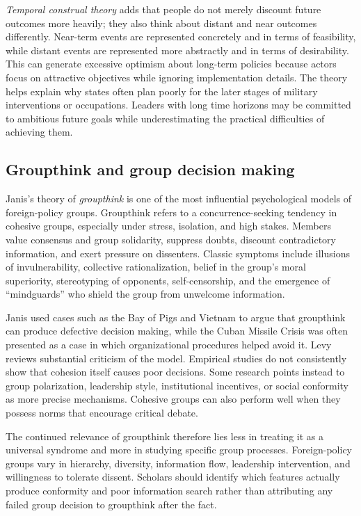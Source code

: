 \emph{Temporal construal theory} adds that people do not merely discount future outcomes more heavily; they also think about distant and near outcomes differently. Near-term events are represented concretely and in terms of feasibility, while distant events are represented more abstractly and in terms of desirability. This can generate excessive optimism about long-term policies because actors focus on attractive objectives while ignoring implementation details. The theory helps explain why states often plan poorly for the later stages of military interventions or occupations. Leaders with long time horizons may be committed to ambitious future goals while underestimating the practical difficulties of achieving them.

\subsection{Groupthink and group decision making}

Janis's theory of \emph{groupthink} is one of the most influential psychological models of foreign-policy groups. Groupthink refers to a concurrence-seeking tendency in cohesive groups, especially under stress, isolation, and high stakes. Members value consensus and group solidarity, suppress doubts, discount contradictory information, and exert pressure on dissenters. Classic symptoms include illusions of invulnerability, collective rationalization, belief in the group's moral superiority, stereotyping of opponents, self-censorship, and the emergence of ``mindguards'' who shield the group from unwelcome information.

Janis used cases such as the Bay of Pigs and Vietnam to argue that groupthink can produce defective decision making, while the Cuban Missile Crisis was often presented as a case in which organizational procedures helped avoid it. Levy reviews substantial criticism of the model. Empirical studies do not consistently show that cohesion itself causes poor decisions. Some research points instead to group polarization, leadership style, institutional incentives, or social conformity as more precise mechanisms. Cohesive groups can also perform well when they possess norms that encourage critical debate.

The continued relevance of groupthink therefore lies less in treating it as a universal syndrome and more in studying specific group processes. Foreign-policy groups vary in hierarchy, diversity, information flow, leadership intervention, and willingness to tolerate dissent. Scholars should identify which features actually produce conformity and poor information search rather than attributing any failed group decision to groupthink after the fact.

